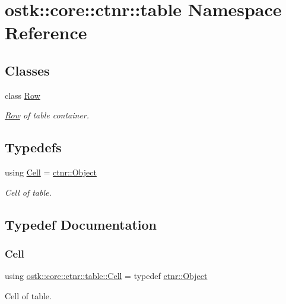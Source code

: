 \hypertarget{namespaceostk_1_1core_1_1ctnr_1_1table}{}\section{ostk\+:\+:core\+:\+:ctnr\+:\+:table Namespace Reference}
\label{namespaceostk_1_1core_1_1ctnr_1_1table}
\subsection*{Classes}
\begin{DoxyCompactItemize}
\item 
class \hyperlink{classostk_1_1core_1_1ctnr_1_1table_1_1_row}{Row}
\begin{DoxyCompactList}\small\item\em \hyperlink{classostk_1_1core_1_1ctnr_1_1table_1_1_row}{Row} of table container. \end{DoxyCompactList}\end{DoxyCompactItemize}
\subsection*{Typedefs}
\begin{DoxyCompactItemize}
\item 
using \hyperlink{namespaceostk_1_1core_1_1ctnr_1_1table_a697fb8eda17fde15703741a0c49036b9}{Cell} = \hyperlink{classostk_1_1core_1_1ctnr_1_1_object}{ctnr\+::\+Object}
\begin{DoxyCompactList}\small\item\em Cell of table. \end{DoxyCompactList}\end{DoxyCompactItemize}


\subsection{Typedef Documentation}
\mbox{\label{namespaceostk_1_1core_1_1ctnr_1_1table_a697fb8eda17fde15703741a0c49036b9}} 
\subsubsection{\texorpdfstring{Cell}{Cell}}
{\footnotesize\ttfamily using \hyperlink{namespaceostk_1_1core_1_1ctnr_1_1table_a697fb8eda17fde15703741a0c49036b9}{ostk\+::core\+::ctnr\+::table\+::\+Cell} = typedef \hyperlink{classostk_1_1core_1_1ctnr_1_1_object}{ctnr\+::\+Object}}



Cell of table. 

